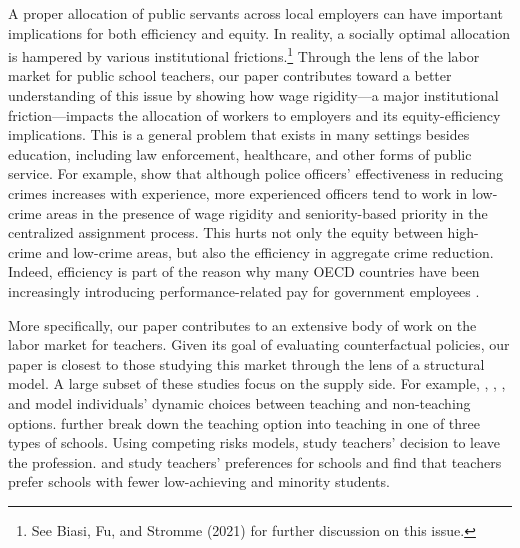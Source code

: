 \documentclass[notitlepage,12pt]{article}%
\begin{document}
A proper allocation of public servants across local employers can have
important implications for both efficiency and equity. In reality, a socially
optimal allocation is hampered by various institutional
frictions.\footnote{See Biasi, Fu, and Stromme (2021) for further discussion
on this issue.} Through the lens
of the labor market for public school teachers, our paper contributes toward a
better understanding of this issue by showing how wage rigidity---a major
institutional friction---impacts the allocation of workers to employers and
its equity-efficiency implications. This is a general problem that exists in
many settings besides education, including law enforcement, healthcare, and
other forms of public service. For example, \citet{ba2021police} show that
although police officers' effectiveness in reducing crimes increases with
experience, more experienced officers tend to work in low-crime areas in the
presence of wage rigidity and seniority-based priority in the centralized
assignment process. This hurts not only the equity between high-crime and
low-crime areas, but also the efficiency in aggregate crime reduction. Indeed,
efficiency is part of the reason why many OECD countries have been
increasingly introducing performance-related pay for government employees \citep{cardona2006performance}.

More specifically, our paper contributes to an extensive body of work on the
labor market for teachers. Given its goal of evaluating counterfactual
policies, our paper is closest to those studying this market through the lens
of a structural model. A large subset of these studies focus on the supply
side. For example, \citet{stinebrickner2001compensation},
\citet{stinebrickner2001dynamic}, \citet{wiswall2007licensing}, and
\citet{lang2018determinants} model individuals' dynamic choices between
teaching and non-teaching options. \citet{behrman2016teacher} further break
down the teaching option into teaching in one of three types of schools. Using
competing risks models, \citet{dolton1999turnover} study teachers' decision to
leave the profession. \citet{boyd2005explaining} and \citet{scafidi2007race}
study teachers' preferences for schools and find that teachers prefer schools
with fewer low-achieving and minority students.
\end{document}
